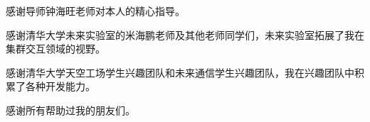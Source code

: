 \begin{acknowledgement}
  感谢导师钟海旺老师对本人的精心指导。


  感谢清华大学未来实验室的米海鹏老师及其他老师同学们，未来实验室拓展了我在集群交互领域的视野。

  感谢清华大学天空工场学生兴趣团队和未来通信学生兴趣团队，我在兴趣团队中积累了各种开发能力。

  感谢所有帮助过我的朋友们。

\end{acknowledgement}
